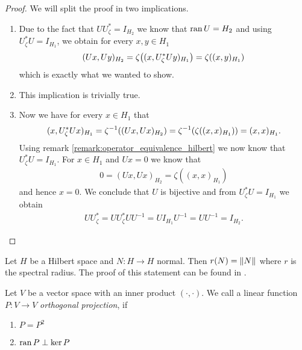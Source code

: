 \begin{proof}
	We will split the proof in two implications.
	\begin{enumerate}
		\item[\Quote{$(\mathrm{i}) \Rightarrow \ (\mathrm{ii})$}] Due to the fact that $U U_\zeta^\ast = I_{H_2}$ we know that $\operatorname{ran} U = H_2$ and using $U_\zeta^\ast U = I_{H_1}$, we obtain for every $x,y \in H_1$ 
		\begin{align*}
			(Ux, Uy)_{H_2} = \zeta{\left ( (x, U_\zeta^\ast U y)_{H_1} \right )} = \zeta {\left ( (x,y)_{H_1} \right )}
		\end{align*}
		which is exactly what we wanted to show.
		
		\item[\Quote{$(\mathrm{ii}) \Rightarrow \ (\mathrm{iii})$}] This implication is trivially true.
		
		\item[\Quote{$(\mathrm{iii}) \Rightarrow \ (\mathrm{i})$}] Now we have for every $x \in H_1$ that 
		\begin{align*}
			(x, U_\zeta^\ast U x)_{H_1} = \zeta^{-1}{\left ( (Ux, Ux)_{H_2} \right )} = \zeta^{-1}{\left ( \zeta{\left ( (x,x)_{H_1} \right )} \right )} = (x,x)_{H_1}.
		\end{align*}
		Using remark \ref{remark:operator_equivalence_hilbert} we now know that $U_\zeta^\ast U = I_{H_1}$. For $x \in H_1$ and $Ux = 0$ we know that 
		\begin{align*}
			0 = (Ux, Ux)_{H_2} = \zeta((x,x)_{H_1})
		\end{align*}
		and hence $x = 0$. We conclude that $U$ is bijective and from $U_\zeta^\ast U = I_{H_1}$ we obtain
		\begin{align*}
			U U_\zeta^\ast = U U_\zeta^\ast UU^{-1} = UI_{H_1}U^{-1} = UU^{-1} = I_{H_2}.
		\end{align*}
	\end{enumerate}
\end{proof}


\begin{remark} \label{remark:spectral_radius}
	Let $H$ be a Hilbert space and $N: H \to H$ normal. Then $r(N) = {\left \| N \right \|}_{}$ where $r$ is the spectral radius. The proof of this statement can be found in \cite[p.142]{FAna1}.
\end{remark}


\begin{definition}
	Let $V$ be a vector space with an inner product $(\cdot, \cdot)$. We call a linear function $P: V \to V$ \textit{orthogonal projection}, if
	\begin{enumerate}
		\item $P = P^2$
		\item $\operatorname{ran} P \perp \ker P$
	\end{enumerate}
\end{definition}


